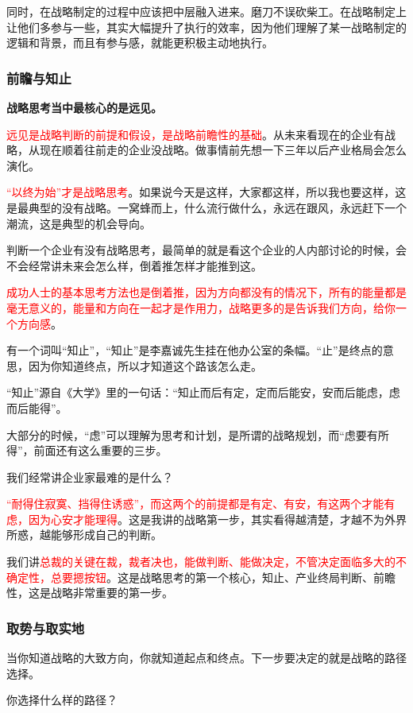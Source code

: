 \documentclass[12pt]{article}
\begin{document}
同时，在战略制定的过程中应该把中层融入进来。磨刀不误砍柴工。在战略制定上让他们多参与一些，其实大幅提升了执行的效率，因为他们理解了某一战略制定的逻辑和背景，而且有参与感，就能更积极主动地执行。

\subsubsection{前瞻与知止}
\textbf{战略思考当中最核心的是远见。}

\textcolor{red}{远见是战略判断的前提和假设，是战略前瞻性的基础}。从未来看现在的企业有战略，从现在顺着往前走的企业没战略。做事情前先想一下三年以后产业格局会怎么演化。

\textcolor{red}{“以终为始”才是战略思考}。如果说今天是这样，大家都这样，所以我也要这样，这是最典型的没有战略。一窝蜂而上，什么流行做什么，永远在跟风，永远赶下一个潮流，这是典型的机会导向。

判断一个企业有没有战略思考，最简单的就是看这个企业的人内部讨论的时候，会不会经常讲未来会怎么样，倒着推怎样才能推到这。

\textcolor{red}{成功人士的基本思考方法也是倒着推，因为方向都没有的情况下，所有的能量都是毫无意义的，能量和方向在一起才是作用力，战略更多的是告诉我们方向，给你一个方向感}。

有一个词叫“知止”，“知止”是李嘉诚先生挂在他办公室的条幅。“止”是终点的意思，因为你知道终点，所以才知道这个路该怎么走。

“知止”源自《大学》里的一句话：“知止而后有定，定而后能安，安而后能虑，虑而后能得”。

大部分的时候，“虑”可以理解为思考和计划，是所谓的战略规划，而“虑要有所得”，前面还有这么重要的三步。

我们经常讲企业家最难的是什么？

\textcolor{red}{“耐得住寂寞、挡得住诱惑”，而这两个的前提都是有定、有安，有这两个才能有虑，因为心安才能理得}。这是我讲的战略第一步，其实看得越清楚，才越不为外界所惑，越能够形成自己的判断。

我们讲\textcolor{red}{总裁的关键在裁，裁者决也，能做判断、能做决定，不管决定面临多大的不确定性，总要摁按钮}。这是战略思考的第一个核心，知止、产业终局判断、前瞻性，这是战略非常重要的第一步。

\subsubsection{取势与取实地}
当你知道战略的大致方向，你就知道起点和终点。下一步要决定的就是战略的路径选择。

你选择什么样的路径？
\end{document}
